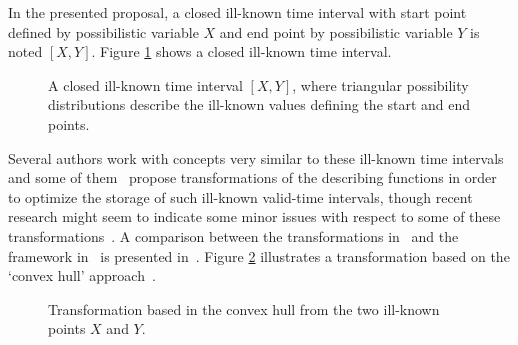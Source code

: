 In the presented proposal, a closed ill-known time interval with start point defined by possibilistic variable $X$ and end point by possibilistic variable $Y$ is noted $\left[X, Y\right]$. Figure \ref{fig:interval} shows a closed ill-known time interval. %


\begin{figure}
\centering

\caption{A closed ill-known time interval $\left[X, Y\right]$, where triangular possibility distributions describe the ill-known values defining the start and end points.}
\label{fig:interval}
\end{figure}


Several authors work with concepts very similar to these ill-known time intervals and some of them~\cite{garrido2009} propose transformations of the describing functions in order to optimize the storage of such ill-known valid-time intervals, though recent research might seem to indicate some minor issues with respect to some of these transformations~\cite{Pon11}. A comparison between the transformations in~\cite{garrido2009} and the framework in~\cite{Pon11} is presented in~\cite{pon12}. Figure \ref{fig:convexhull} illustrates a transformation based on the `convex hull' approach~\cite{garrido2009}.



\begin{figure}
\centering

\caption{Transformation based in the convex hull from the two ill-known points $X$ and $Y$. }
\label{fig:convexhull}
\end{figure}

